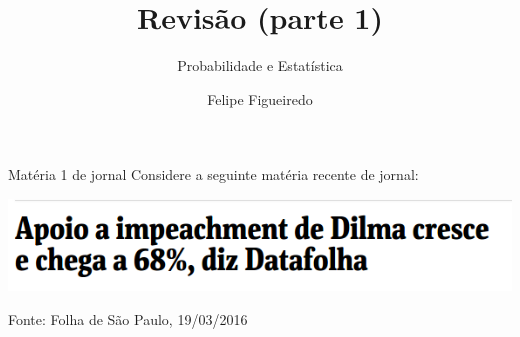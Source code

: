 \documentclass{beamer}
\title[Revisão 1] %
{Revisão (parte 1)}
\subtitle
{Probabilidade e Estatística} %
\author%
{Felipe Figueiredo}%
\institute[UNIAN] %
{UNIAN - Centro Universitário Anhanguera de Niterói
}
\date%
{}
\begin{document}
\begin{frame}
  \titlepage
\end{frame}










\begin{frame}{Matéria 1 de jornal}
Considere a seguinte matéria recente de jornal:

\bigskip
\bigskip
\bigskip
\centering \includegraphics[width=.9\textwidth]{Revisao1/manchete}

\vfill
Fonte: Folha de São Paulo, 19/03/2016
\end{frame}
\end{document}
